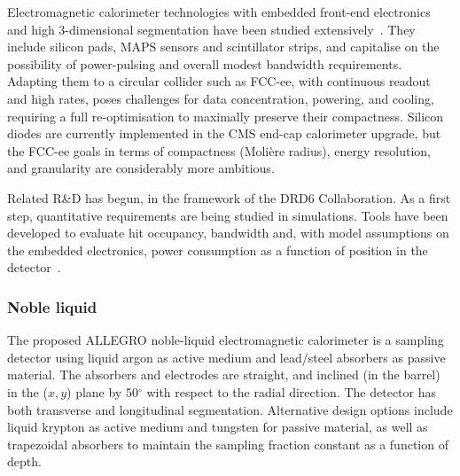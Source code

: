 Electromagnetic calorimeter technologies with embedded front-end electronics 
and high 3-dimensional segmentation have been studied extensively~\cite{Sefkow:2015hna}. 
They include silicon pads, MAPS sensors and scintillator strips, 
and capitalise on the possibility of power-pulsing and overall modest bandwidth requirements. 
Adapting them to a circular collider such as FCC-ee, with continuous readout and high rates, 
poses challenges for data concentration, powering, and cooling, 
requiring a full re-optimisation to maximally preserve their compactness. 
Silicon diodes are currently implemented in the CMS end-cap calorimeter upgrade, 
but the FCC-ee goals in terms of compactness (Moli\`ere radius), 
energy resolution, and granularity are considerably more ambitious. 

Related R\&D has begun, in the framework of the DRD6 Collaboration. 
As a first step, quantitative requirements are being studied in simulations. 
Tools have been developed to evaluate hit occupancy, bandwidth and, 
with model assumptions on the embedded electronics, 
power consumption as a function of position in the detector~\cite{Hassouna:2024frw}.

\subsubsection{Noble liquid}
 
The proposed ALLEGRO noble-liquid electromagnetic calorimeter is a sampling detector 
using liquid argon as active medium and lead/steel absorbers as passive material. 
The absorbers and electrodes are straight, and inclined (in the barrel) in the ($x,y$) plane 
by 50$^\circ$ with respect to the radial direction. 
The detector has both transverse and longitudinal segmentation.
Alternative design options include liquid krypton as active medium and tungsten for passive material, 
as well as trapezoidal absorbers to maintain the sampling fraction constant as a function of depth.

